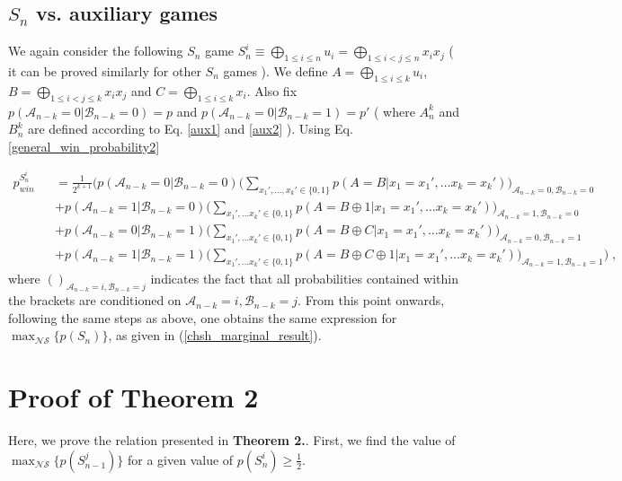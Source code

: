 \begin{widetext}
\begin{appendices}
\subsection*{${S_n}$ {vs. auxiliary games}}
We again consider the following $S_n$ game $S_n^i \equiv  \bigoplus_{1\le i \le n} u_i = \bigoplus_{1\le i<j \le n} x_i x_j$ ( it can be proved similarly for other $S_n$ games ).
We define $A=\bigoplus_{1\le i \le k}u_i$, $B=\bigoplus_{1\le i<j \le k}x_ix_j$ and $C=\bigoplus_{1\le i \le k}x_i$. Also fix $p(\mathcal{A}_{n-k}=0|\mathcal{B}_{n-k}=0)=p$ and $p(\mathcal{A}_{n-k}=0|\mathcal{B}_{n-k}=1)=p{'}$ ( where $A_n^k$ and $B_n^k$ are defined according to Eq. \ref{aux1} and \ref{aux2} ). Using Eq. \ref{general_win_probability2}

\begin{eqnarray}
\label{S_n_vs_marginal_win_probability2}
p_{win}^{S_n^i} &&= \frac{1}{2^{k+1}} \Bigg( p(\mathcal{A}_{n-k}=0|\mathcal{B}_{n-k}=0)\bigg(\sum_{x_1{'},\ldots ,x_{k}{'} \in \{0,1\}}p(A=B|x_1=x_1{'},\ldots x_{k}=x_{k}{'})\bigg)_{\mathcal{A}_{n-k}=0,\mathcal{B}_{n-k}=0}
{}\nonumber\\&&+p(\mathcal{A}_{n-k}=1|\mathcal{B}_{n-k}=0)\bigg(\sum_{x_1{'},\ldots x_{k}{'} \in \{0,1\}}p(A=B\oplus1|x_1=x_1{'},\ldots x_{k}=x_{k}{'})\bigg)_{\mathcal{A}_{n-k}=1,\mathcal{B}_{n-k}=0}{}\nonumber\\&&
+p(\mathcal{A}_{n-k}=0|\mathcal{B}_{n-k}=1)\bigg(\sum_{x_1{'},\ldots x_{k}{'} \in \{0,1\}}p(A=B\oplus C|x_1=x_1{'},\ldots x_{k}=x_{k}{'})\bigg)_{\mathcal{A}_{n-k}=0,\mathcal{B}_{n-k}=1}
{}\nonumber\\&&+p(\mathcal{A}_{n-k}=1|\mathcal{B}_{n-k}=1)\bigg(\sum_{x_1{'},\ldots x_{k}{'} \in \{0,1\}}p(A=B\oplus C \oplus 1|x_1=x_1{'},\ldots x_{k}=x_{k}{'})\bigg)_{\mathcal{A}_{n-k}=1,\mathcal{B}_{n-k}=1} \Bigg)  \; ,
\end{eqnarray}
where $()_{\mathcal{A}_{n-k}=i,\mathcal{B}_{n-k}=j}$ indicates the fact that all probabilities contained within the brackets are conditioned on $\mathcal{A}_{n-k}=i,\mathcal{B}_{n-k}=j$.
From this point onwards, following the same steps as above, one obtains the same expression for $\max_{\mathcal{NS}}  \{p({S_n})\}$, as given in (\ref{chsh_marginal_result}).


\section {Proof of Theorem 2}
Here, we prove the relation presented in \textbf{Theorem 2.}. First, we find the value of $\max_{\mathcal{NS}}\{p({S_{n-1}^j})\}$ for a given value of $p({S_n^i})\ge \frac{1}{2}$.

\end{appendices}
\end{widetext}
